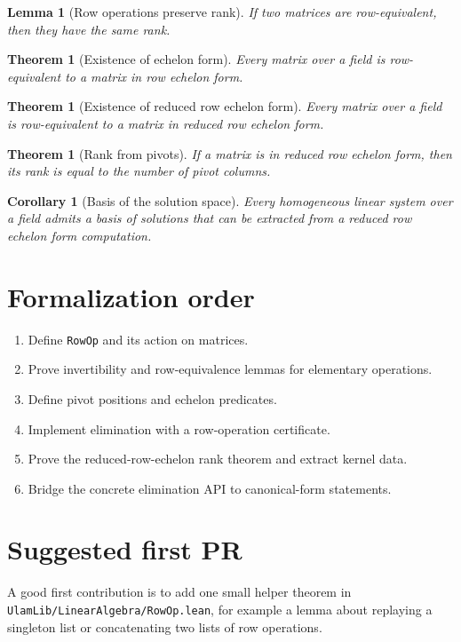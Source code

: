 \documentclass[11pt]{article}
\newtheorem{lemma}[definition]{Lemma}
\newtheorem{theorem}[definition]{Theorem}
\newtheorem{corollary}[definition]{Corollary}
\begin{document}
\begin{lemma}[Row operations preserve rank]\label{lem:row-ops-preserve-rank}
If two matrices are row-equivalent, then they have the same rank.
\end{lemma}

\begin{theorem}[Existence of echelon form]\label{thm:existence-of-echelon-form}
Every matrix over a field is row-equivalent to a matrix in row echelon form.
\end{theorem}

\begin{theorem}[Existence of reduced row echelon form]
\label{thm:existence-of-reduced-row-echelon-form}
Every matrix over a field is row-equivalent to a matrix in reduced row echelon
form.
\end{theorem}

\begin{theorem}[Rank from pivots]\label{thm:rank-from-pivots}
If a matrix is in reduced row echelon form, then its rank is equal to the
number of pivot columns.
\end{theorem}

\begin{corollary}[Basis of the solution space]\label{cor:basis-of-kernel}
Every homogeneous linear system over a field admits a basis of solutions that
can be extracted from a reduced row echelon form computation.
\end{corollary}

\section{Formalization order}

\begin{enumerate}
\item Define \texttt{RowOp} and its action on matrices.
\item Prove invertibility and row-equivalence lemmas for elementary operations.
\item Define pivot positions and echelon predicates.
\item Implement elimination with a row-operation certificate.
\item Prove the reduced-row-echelon rank theorem and extract kernel data.
\item Bridge the concrete elimination API to canonical-form statements.
\end{enumerate}

\section{Suggested first PR}

A good first contribution is to add one small helper theorem in
\texttt{UlamLib/LinearAlgebra/RowOp.lean}, for example a lemma about replaying a
singleton list or concatenating two lists of row operations.
\end{document}
